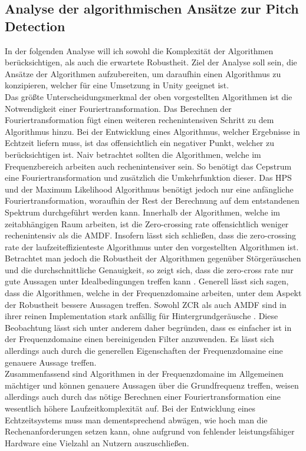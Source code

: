 \subsection{Analyse der algorithmischen Ansätze zur Pitch Detection}
\label{sec:analyse_echtzeit}
In der folgenden Analyse will ich sowohl die Komplexität der Algorithmen berücksichtigen, als auch die erwartete Robustheit. Ziel der Analyse soll sein, die Ansätze der Algorithmen aufzubereiten, um daraufhin einen Algorithmus zu konzipieren, welcher für eine Umsetzung in Unity geeignet ist. \\
Das größte Unterscheidungsmerkmal der oben vorgestellten Algorithmen ist die Notwendigkeit einer Fouriertransformation. Das Berechnen der Fouriertransformation fügt einen weiteren rechenintensiven Schritt zu dem Algorithmus hinzu. Bei der Entwicklung eines Algorithmus, welcher Ergebnisse in Echtzeit liefern muss, ist das offensichtlich ein negativer Punkt, welcher zu berücksichtigen ist. Naiv betrachtet sollten die Algorithmen, welche im Frequenzbereich arbeiten auch rechenintensiver sein. So benötigt das Cepstrum eine Fouriertransformation und zusätzlich die Umkehrfunktion dieser. Das HPS und der Maximum Likelihood Algorithmus benötigt jedoch nur eine anfängliche Fouriertransformation, woraufhin der Rest der Berechnung auf dem entstandenen Spektrum durchgeführt werden kann. Innerhalb der Algorithmen, welche im zeitabhängigen Raum arbeiten, ist die Zero-crossing rate offensichtlich weniger rechenintensiv als die AMDF. Insofern lässt sich schließen, dass die zero-crossing rate der laufzeiteffizienteste Algorithmus unter den vorgestellten Algorithmen ist. Betrachtet man jedoch die Robustheit der Algorithmen gegenüber Störgeräuschen und die durchschnittliche Genauigkeit, so zeigt sich, dass die zero-cross rate nur gute Aussagen unter Idealbedingungen treffen kann \cite{amado2008pitch}. Generell lässt sich sagen, dass die Algorithmen, welche in der Frequenzdomaine arbeiten, unter dem Aspekt der Robustheit bessere Aussagen treffen. Sowohl ZCR als auch AMDF sind in ihrer reinen Implementation stark anfällig für Hintergrundgeräusche \cite{cuadra2001hps}. Diese Beobachtung lässt sich unter anderem daher begründen, dass es einfacher ist in der Frequenzdomaine einen bereinigenden Filter anzuwenden. Es lässt sich allerdings auch durch die generellen Eigenschaften der Frequenzdomaine eine genauere Aussage treffen. \\
Zusammenfassend sind Algorithmen in der Frequenzdomaine im Allgemeinen mächtiger und können genauere Aussagen über die Grundfrequenz treffen, weisen allerdings auch durch das nötige Berechnen einer Fouriertransformation eine wesentlich höhere Laufzeitkomplexität auf. Bei der Entwicklung eines Echtzeitsystems muss man dementsprechend abwägen, wie hoch man die Rechenanforderungen setzen kann, ohne aufgrund von fehlender leistungsfähiger Hardware eine Vielzahl an Nutzern auszuschließen. 


